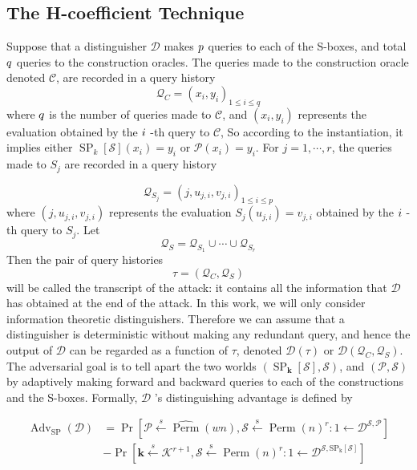 \subsection{The H-coefficient Technique}
Suppose that a distinguisher $\mathcal{D}$ makes $\mathnormal{p}$ queries to each of the S-boxes, and total $\mathnormal{q}$ queries to the construction oracles. The queries made to the construction oracle denoted $\mathcal{C}$, are recorded in a query history $$
\mathcal{Q}_{C} = (x_i,y_i)_{1 \leq i \leq q}
$$
where $\mathnormal{q}$ is the number of queries made to $\mathcal{C}$, and $(x_i,y_i)$ represents the evaluation obtained by the $\mathnormal{i}$ -th query to $\mathcal{C}$, So according to the instantiation, it implies either $\operatorname{SP}_k[\mathcal{S}](x_i) = y_i$  or $\mathcal{P}(x_i) = y_i$. For $j = 1,\cdots,r$, the queries made to $S_j$ are recorded in a query history

$$
\mathcal{Q}_{S_j} = (j, u_{j,i}, v_{j,i})_{1 \leq i \leq p}
$$
where $(j, u_{j,i}, v_{j,i})$  represents the evaluation $S_j(u_{j,i}) = v_{j,i}$ obtained by the $\mathnormal{i}$ -th query to $S_j$. Let
$$
\mathcal{Q}_{S}=\mathcal{Q}_{S_1} \cup \cdots \cup \mathcal{Q}_{S_r}
$$
Then the pair of query histories
$$
\tau = (\mathcal{Q}_{C}, \mathcal{Q}_{S})
$$
will be called the transcript of the attack: it contains all the information that  $\mathcal{D}$ has obtained at the end of the attack. In this work, we will only consider
information theoretic distinguishers. Therefore we can assume that a distinguisher is deterministic without making any redundant query, and hence the output of  $\mathcal{D}$  can be regarded as a function of $\tau$, denoted $\mathcal{D}(\tau)$ or $\mathcal{D}(\mathcal{Q}_C, \mathcal{Q}_S)$.\\

The adversarial goal is to tell apart the two worlds $\left(\operatorname{SP}_{\mathbf{k}}[\mathcal{S}],\mathcal{S}\right)$, and $\left(\mathcal{P},\mathcal{S}\right)$ by adaptively making forward and backward queries to each of the constructions and the S-boxes. Formally, $\mathcal{D}$ 's distinguishing advantage is defined by

\begin{equation}
\begin{aligned}
\operatorname{Adv}_{\mathrm{SP}}(\mathcal{D}) &=\operatorname{Pr}\left[\mathcal{P} \stackrel{s}{\leftarrow} \widehat{\operatorname{Perm}}(w n), \mathcal{S} \stackrel{\mathrm{s}}{\leftarrow} \operatorname{Perm}(n)^{r}: 1 \leftarrow \mathcal{D}^{\mathcal{S},\mathcal{P}}\right] \\
&-\operatorname{Pr}\left[\mathbf{k} \stackrel{s}{\leftarrow} \mathcal{K}^{r+1}, \mathcal{S} \stackrel{\mathrm{s}}{\leftarrow} \operatorname{Perm}(n)^{r}: 1 \leftarrow \mathcal{D}^{\mathcal{S}, \mathrm{SP}_{\mathrm{k}}[\mathcal{S}]}\right]
\end{aligned}
\end{equation}

